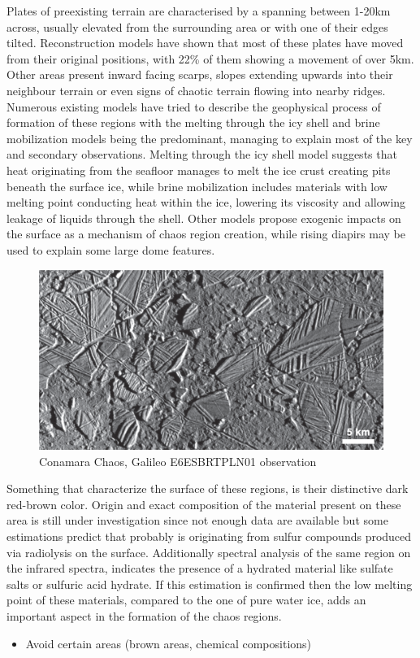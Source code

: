 Plates of preexisting terrain are characterised by a spanning between 1-20km across, usually elevated from the surrounding area or with one of their edges tilted. Reconstruction models have shown that most of these plates have moved from their original positions, with 22\% of them showing a movement of over 5km. Other areas present inward facing scarps, slopes extending upwards into their neighbour terrain or even signs of chaotic terrain flowing into nearby ridges.
Numerous existing models have tried to describe the geophysical process of formation of these regions with the melting through the icy shell and brine mobilization models being the predominant, managing to explain most of the key and secondary observations. Melting through the icy shell model suggests that heat originating from the seafloor manages to melt the ice crust creating pits beneath the surface ice, while brine mobilization includes materials with low melting point conducting heat within the ice, lowering its viscosity and allowing leakage of liquids through the shell. Other models propose exogenic impacts on the surface as a mechanism of chaos region creation, while rising diapirs may be used to explain some large dome features.  
\begin{figure}[h!]
    \centering
    \includegraphics[scale=0.3]{figures/Orbiter/chaos.png}
    \caption{Conamara Chaos, Galileo E6ESBRTPLN01 observation \cite{chaosterrain}}
    \label{fig:conamara_chaos}
\end{figure}
Something that characterize the surface of these regions, is their distinctive dark red-brown color. Origin and exact composition of the material present on these area is still under investigation since not enough data are available but some estimations predict that probably is originating from sulfur compounds produced via radiolysis on the surface. Additionally spectral analysis of the same region on the infrared spectra, indicates the presence of a hydrated material like sulfate salts or sulfuric acid hydrate. If this estimation is confirmed then the low melting point of these materials, compared to the one of pure water ice, adds an important aspect in the formation of the chaos regions.
\begin{itemize}
    \item Avoid certain areas (brown areas, chemical compositions)
\end{itemize}

